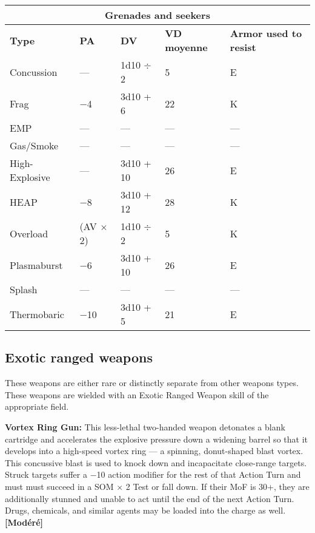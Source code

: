 {{\begin{table} \begin{tabular}{|l|l|l|l|l|} \hline

\multicolumn{5}{|c|}{\textbf{Grenades and seekers}} \\ \hline

\textbf{Type}	&\textbf{PA}	&\textbf{DV}	&\textbf{VD moyenne}	&\textbf{Armor used to resist} \\ \hline

Concussion	&--- &1d10 $\div$ 2	&5	&E \\ \hline

Frag	&$-$4	&3d10 + 6	&22	&K \\ \hline

EMP	&--- &--- &--- &--- \\ \hline

Gas/Smoke	&--- &--- &--- &--- \\ \hline

High-Explosive	&--- &3d10 + 10	&26	&E \\ \hline

HEAP	&$-$8	&3d10 + 12	&28	&K \\ \hline

Overload	&(AV $\times$ 2)	&1d10 $\div$ 2	&5	&K \\ \hline

Plasmaburst	&$-$6	&3d10 + 10	&26	&E \\ \hline

Splash	&--- &--- &--- &--- \\ \hline

Thermobaric	&$-$10	&3d10 + 5	&21	&E \\ \hline

\end{tabular} \label{tab:grenades-seekers} \end{table} 

\subsection{Exotic ranged weapons} \label{sec:exotic-ranged-weapons} 

These weapons are either rare or distinctly separate from other weapons types. These weapons are wielded with an Exotic Ranged Weapon skill of the appropriate field. 

\textbf{Vortex Ring Gun:} This less-lethal two-handed weapon detonates a blank cartridge and accelerates the explosive pressure down a widening barrel so that it develops into a high-speed vortex ring --- a spinning, donut-shaped blast vortex. This concussive blast is used to knock down and incapacitate close-range targets. Struck targets suffer a $-$10 action modifier for the rest of that Action Turn and must must succeed in a SOM $\times$ 2 Test or fall down. If their MoF is 30+, they are additionally stunned and unable to act until the end of the next Action Turn. Drugs, chemicals, and similar agents may be loaded into the charge as well. \textbf{[Modéré]} 

}}

